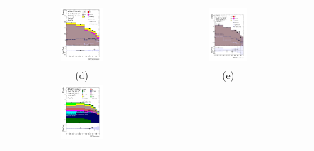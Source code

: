 \documentclass[PAPER, coverpage, atlasdraft=true, texlive=2016, UKenglish]{\ATLASLATEXPATH atlasdoc} %
\providecommand{\DIFadd}[1]{{\protect\color{blue}\uwave{#1}}} %
\providecommand{\DIFaddFL}[1]{\DIFadd{#1}} %
\providecommand{\DIFaddbeginFL}{} %
\providecommand{\DIFaddendFL}{} %
\providecommand{\DIFdelbeginFL}{} %
\providecommand{\DIFdelendFL}{} %
\begin{document}
\begin{figure}[H]
\begin{tabular}{@{}ccc@{}}
\DIFdelbeginFL %
\DIFdelendFL \DIFaddbeginFL \includegraphics[width=0.29\textwidth]{figures/tuH_reg1l1tau1b3j_os.pdf}\DIFaddendFL &
\DIFaddbeginFL \includegraphics[width=0.29\textwidth]{figures/tuH_reg1l2tau1bnj_ss.pdf}\DIFaddendFL \\
(d) & (e)  \DIFaddbeginFL & \DIFaddFL{(f) }\DIFaddendFL \\
\DIFdelbeginFL %
\DIFdelendFL %
\DIFaddbeginFL \includegraphics[width=0.29\textwidth]{figures/tuH_reg2mtau1b2jos.pdf}\DIFaddendFL &

\end{tabular}
\end{figure}
\end{document}
